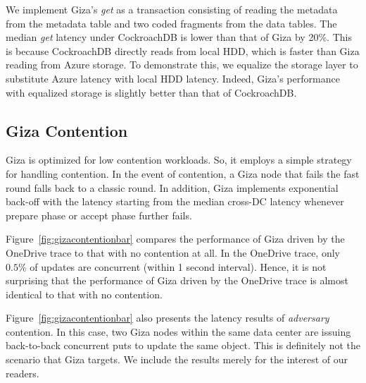 We implement Giza's {\em get} as a transaction consisting of reading the
metadata from the metadata table and two coded fragments from the data tables.
The median {\em get} latency under CockroachDB is lower than that of Giza by
20\%. This is because CockroachDB directly reads from local HDD,
which is faster than Giza reading from Azure storage. To demonstrate this, we
equalize the storage layer to substitute Azure latency with local HDD latency.
Indeed, Giza's performance with equalized storage is slightly better than that
of CockroachDB. 

%

\subsection{Giza Contention}

Giza is optimized for low contention workloads. So, it employs a simple strategy
for handling contention. In the event of contention, a Giza node that fails the
fast round falls back to a classic round. In addition, Giza implements
exponential back-off with the latency starting from the median cross-DC latency
whenever prepare phase or accept phase further fails.

Figure~\ref{fig:gizacontentionbar} compares the performance of Giza driven by
the OneDrive trace to that with no contention at all. In the OneDrive trace,
only $0.5\%$ of updates are concurrent (within 1 second interval). Hence, it is
not surprising that the performance of Giza driven by the OneDrive trace is
almost identical to that with no contention.

Figure~\ref{fig:gizacontentionbar} also presents the latency results of {\em adversary} contention. In this case, two Giza nodes within the same data center are issuing back-to-back concurrent puts to update the same object. This is definitely not the scenario that Giza targets. We include the results merely for the interest of our readers.


